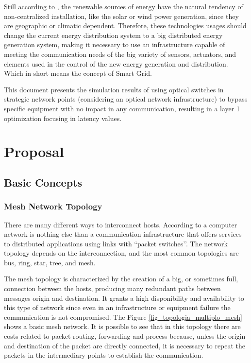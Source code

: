\documentclass[conference]{IEEEtran}
\begin{document}
Still according to \cite{Art-Gungor2013}, the renewable sources of energy have the natural tendency of non-centralized installation, like the solar or wind power generation, since they are geographic or climatic dependent. Therefore, these technologies usages should change the current energy distribution system to a big distributed energy generation system, making it necessary to use an infrastructure capable of meeting the communication needs of the big variety of sensors, actuators, and elements used in the control of the new energy generation and distribution. Which in short means the concept of Smart Grid.

This document presents the simulation results of using optical switches in strategic network points (considering an optical network infrastructure) to bypass specific equipment with no impact in any communication, resulting in a layer 1 optimization focusing in latency values.

\section{Proposal}

\subsection{Basic Concepts}

\subsubsection{Mesh Network Topology}
There are many different ways to interconnect hosts. According to \cite{Book-Kurose2013} a computer network is nothing else than a communication infrastructure that offers services to distributed applications using links with ``packet switches’’. The network topology depends on the interconnection, and the most common topologies are bus, ring, star, tree, and mesh.

The mesh topology is characterized by the creation of a big, or sometimes full, connection between the hosts, producing many redundant paths between messages origin and destination. It grants a high disponibility and availability to this type of network since even in an infrastructure or equipment failure the communication is not compromised. The Figure \ref{fig_topologia_multiplo_mesh} shows a basic mesh network. It is possible to see that in this topology there are costs related to packet routing, forwarding and process because, unless the origin and destination of the packet are directly connected, it is necessary to repeat the packets in the intermediary points to establish the communication.
\end{document}
